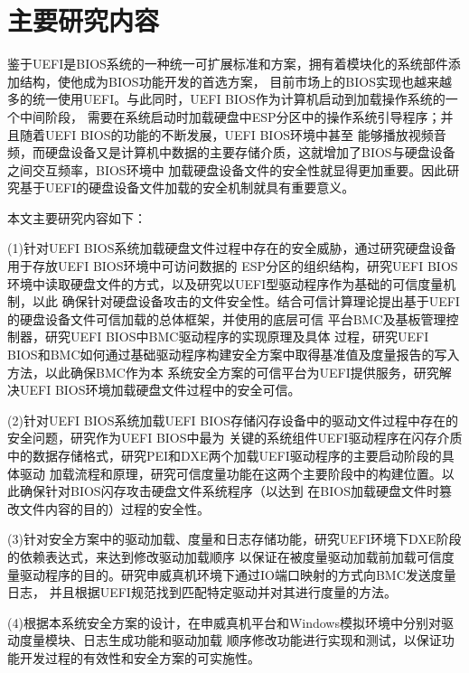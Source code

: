 \section{主要研究内容}
鉴于UEFI是BIOS系统的一种统一可扩展标准和方案，拥有着模块化的系统部件添加结构，使他成为BIOS功能开发的首选方案，
目前市场上的BIOS实现也越来越多的统一使用UEFI。与此同时，UEFI BIOS作为计算机启动到加载操作系统的一个中间阶段，
需要在系统启动时加载硬盘中ESP分区中的操作系统引导程序；并且随着UEFI BIOS的功能的不断发展，UEFI BIOS环境中甚至
能够播放视频音频，而硬盘设备又是计算机中数据的主要存储介质，这就增加了BIOS与硬盘设备之间交互频率\cite{chinese10}，BIOS环境中
加载硬盘设备文件的安全性就显得更加重要。因此研究基于UEFI的硬盘设备文件加载的安全机制就具有重要意义。
\par 本文主要研究内容如下：
\par (1)针对UEFI BIOS系统加载硬盘文件过程中存在的安全威胁，通过研究硬盘设备用于存放UEFI BIOS环境中可访问数据的
ESP分区的组织结构，研究UEFI BIOS环境中读取硬盘文件的方式，以及研究以UEFI型驱动程序作为基础的可信度量机制，以此
确保针对硬盘设备攻击的文件安全性。结合可信计算理论提出基于UEFI的硬盘设备文件可信加载的总体框架，并使用的底层可信
平台BMC及基板管理控制器，研究UEFI BIOS中BMC驱动程序的实现原理及具体
过程，研究UEFI BIOS和BMC如何通过基础驱动程序构建安全方案中取得基准值及度量报告的写入方法，以此确保BMC作为本
系统安全方案的可信平台为UEFI提供服务，研究解决UEFI BIOS环境加载硬盘文件过程中的安全可信。
\par (2)针对UEFI BIOS系统加载UEFI BIOS存储闪存设备中的驱动文件过程中存在的安全问题，研究作为UEFI BIOS中最为
关键的系统组件UEFI驱动程序在闪存介质中的数据存储格式，研究PEI和DXE两个加载UEFI驱动程序的主要启动阶段的具体驱动
加载流程和原理，研究可信度量功能在这两个主要阶段中的构建位置。以此确保针对BIOS闪存攻击硬盘文件系统程序（以达到
在BIOS加载硬盘文件时篡改文件内容的目的）过程的安全性。
\par (3)针对安全方案中的驱动加载、度量和日志存储功能，研究UEFI环境下DXE阶段的依赖表达式，来达到修改驱动加载顺序
以保证在被度量驱动加载前加载可信度量驱动程序的目的。研究申威真机环境下通过IO端口映射的方式向BMC发送度量日志，
并且根据UEFI规范找到匹配特定驱动并对其进行度量的方法。
\par (4)根据本系统安全方案的设计，在申威真机平台和Windows模拟环境中分别对驱动度量模块、日志生成功能和驱动加载
顺序修改功能进行实现和测试，以保证功能开发过程的有效性和安全方案的可实施性。

%
%
